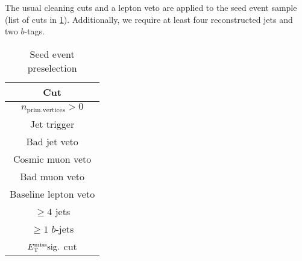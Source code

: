 
 The usual cleaning cuts and a lepton veto are applied to the seed event sample
 (list of cuts in \ref{tb:seed_events_presel}). Additionally, we require at least four reconstructed jets and two $b$-tags.

 \begin{table}[htp]
 \caption{Seed event preselection}
 \begin{center}
 \begin{tabular}{c} \hline
   Cut\\ \hline
   $n_\mathrm{prim. vertices} > 0$\\
   Jet trigger\\
   Bad jet veto\\
   Cosmic muon veto\\
   Bad muon veto\\
   Baseline lepton veto\\
   $\geq 4$ jets\\
   $\geq 1$ $b$-jets\\
   $E_{\mathrm{T}}^{\mathrm{miss}}\rm{sig.}$ cut\\ \hline
 \end{tabular}
 \end{center}
 \label{tb:seed_events_presel}
 \end{table}

